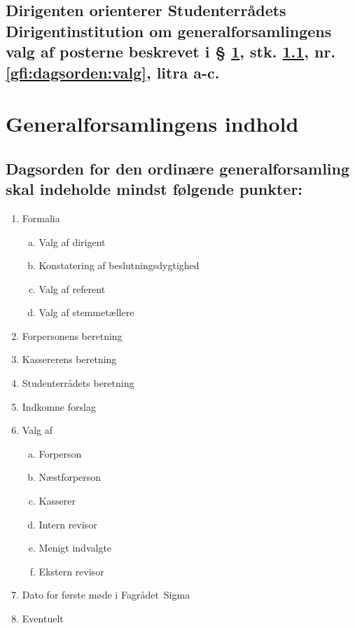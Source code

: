 \documentclass[10pt, danish]{article}
\newcommand{\fagr}{Fagrådet~Sigma}
\begin{document}
        \subsection{Dirigenten orienterer Studenterrådets Dirigentinstitution om generalforsamlingens valg af posterne beskrevet i § \ref{gfi}, stk. \ref{gfi:dagsorden}, nr. \ref{gfi:dagsorden:valg}, litra a-c.}\label{gf:orienterer}
	
	\section{Generalforsamlingens indhold}\label{gfi}
	
	\subsection{Dagsorden for den ordinære generalforsamling skal indeholde mindst følgende punkter:}\label{gfi:dagsorden}
	
	\begin{enumerate}[1), nosep, ref={\arabic*}]
		\item Formalia
                    \label{gfi:dagsorden:formalia}
		\begin{enumerate}[a., nosep]
			\item Valg af dirigent
			\item Konstatering af beslutningsdygtighed
			\item Valg af referent
			\item Valg af stemmetællere
		\end{enumerate}
		\item Forpersonens beretning
                    \label{gfi:dagsorden:forperson-beretning}
		\item Kassererens beretning
                    \label{gfi:dagsorden:kassererens-beretning}
		\item Studenterrådets beretning
                    \label{gfi:dagsorden:studenterraadets-beretning}
		\item Indkomne forslag
                    \label{gfi:dagsorden:forslag}
		\item Valg af
                    \label{gfi:dagsorden:valg}
		\begin{enumerate}[a., nosep, ref={\alph*}]
			\item Forperson
			\item Næstforperson
			\item Kasserer
			\item Intern revisor
			\item Menigt indvalgte
			\item Ekstern revisor
		\end{enumerate}
		\item Dato for første møde i \fagr{}
		\item Eventuelt
                    \label{gfi:dagsorden:eventuelt}
	\end{enumerate}
	
\end{document}
